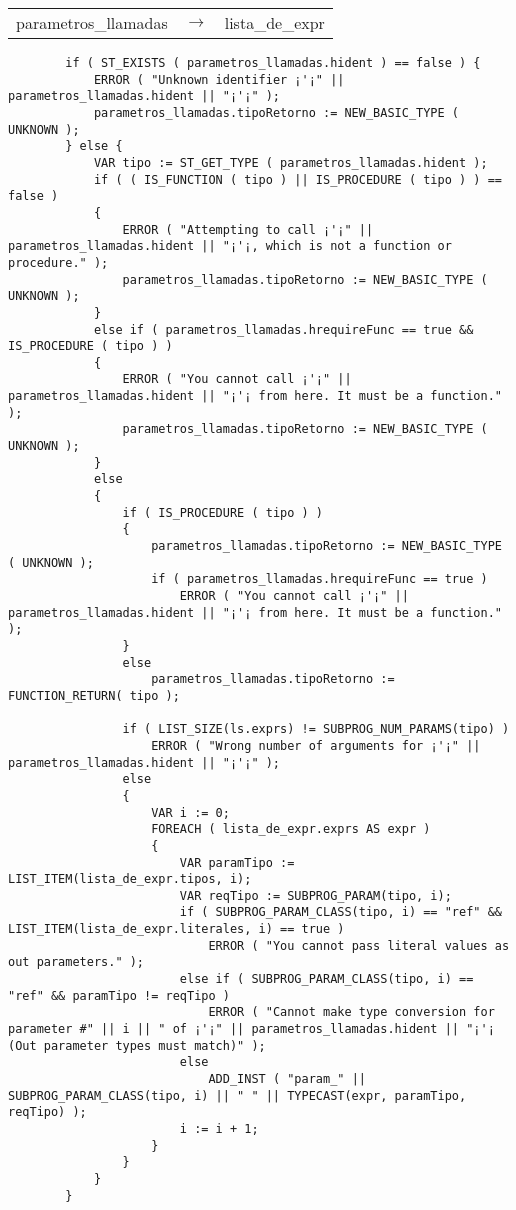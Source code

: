 \small
\begin{tabular}{r c p{}}
			parametros\_llamadas	& $\longrightarrow$ 	& \ter{(} lista\_de\_expr \ter{)} \\
\end{tabular}

\begin{lstlisting}
        if ( ST_EXISTS ( parametros_llamadas.hident ) == false ) {
            ERROR ( "Unknown identifier ¡'¡" || parametros_llamadas.hident || "¡'¡" );
            parametros_llamadas.tipoRetorno := NEW_BASIC_TYPE ( UNKNOWN );
        } else {
            VAR tipo := ST_GET_TYPE ( parametros_llamadas.hident );
            if ( ( IS_FUNCTION ( tipo ) || IS_PROCEDURE ( tipo ) ) == false )
            {
                ERROR ( "Attempting to call ¡'¡" || parametros_llamadas.hident || "¡'¡, which is not a function or procedure." );
                parametros_llamadas.tipoRetorno := NEW_BASIC_TYPE ( UNKNOWN );
            }
            else if ( parametros_llamadas.hrequireFunc == true && IS_PROCEDURE ( tipo ) )
            {
                ERROR ( "You cannot call ¡'¡" || parametros_llamadas.hident || "¡'¡ from here. It must be a function." );
                parametros_llamadas.tipoRetorno := NEW_BASIC_TYPE ( UNKNOWN );
            }
            else
            {
                if ( IS_PROCEDURE ( tipo ) )
                {
                    parametros_llamadas.tipoRetorno := NEW_BASIC_TYPE ( UNKNOWN );
                    if ( parametros_llamadas.hrequireFunc == true )
                        ERROR ( "You cannot call ¡'¡" || parametros_llamadas.hident || "¡'¡ from here. It must be a function." );
                }
                else
                    parametros_llamadas.tipoRetorno := FUNCTION_RETURN( tipo );

                if ( LIST_SIZE(ls.exprs) != SUBPROG_NUM_PARAMS(tipo) )
                    ERROR ( "Wrong number of arguments for ¡'¡" || parametros_llamadas.hident || "¡'¡" );
                else
                {
                    VAR i := 0;
                    FOREACH ( lista_de_expr.exprs AS expr )
                    {
                        VAR paramTipo := LIST_ITEM(lista_de_expr.tipos, i);
                        VAR reqTipo := SUBPROG_PARAM(tipo, i);
                        if ( SUBPROG_PARAM_CLASS(tipo, i) == "ref" && LIST_ITEM(lista_de_expr.literales, i) == true )
                            ERROR ( "You cannot pass literal values as out parameters." );
                        else if ( SUBPROG_PARAM_CLASS(tipo, i) == "ref" && paramTipo != reqTipo )
                            ERROR ( "Cannot make type conversion for parameter #" || i || " of ¡'¡" || parametros_llamadas.hident || "¡'¡ (Out parameter types must match)" );
                        else
                            ADD_INST ( "param_" || SUBPROG_PARAM_CLASS(tipo, i) || " " || TYPECAST(expr, paramTipo, reqTipo) );
                        i := i + 1;
                    }
                }
            }
        }
\end{lstlisting}

